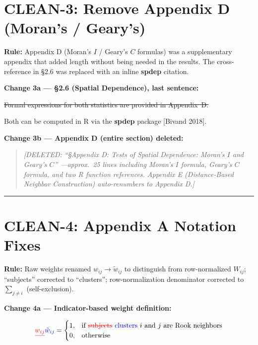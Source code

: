 \documentclass[11pt]{article}
\newcommand{\DEL}[1]{{\color{red}\sout{#1}}}
\newcommand{\ADD}[1]{{\color{blue}#1}}
\begin{document}
\section*{CLEAN-3: Remove Appendix D (Moran's / Geary's)}

\textbf{Rule:} Appendix D (Moran's $I$ / Geary's $C$ formulas) was a supplementary
appendix that added length without being needed in the results. The cross-reference in
\S2.6 was replaced with an inline \textbf{spdep} citation.

\medskip
\textbf{Change 3a --- \S2.6 (Spatial Dependence), last sentence:}

\DEL{Formal expressions for both statistics are provided in Appendix~D.}

\ADD{Both can be computed in R via the \textbf{spdep} package [Bivand 2018].}

\medskip
\textbf{Change 3b --- Appendix D (entire section) deleted:}

\cbstart
\color{red}
\begin{quote}
\textit{[DELETED: ``\S Appendix D: Tests of Spatial Dependence: Moran's $I$ and Geary's $C$''
---approx.\ 25 lines including Moran's $I$ formula, Geary's $C$ formula, and two R function
references. Appendix E (Distance-Based Neighbor Construction) auto-renumbers to Appendix D.]}
\end{quote}
\color{black}
\cbend

\bigskip
\hrule
\bigskip

\section*{CLEAN-4: Appendix A Notation Fixes}

\textbf{Rule:} Raw weights renamed $w_{ij} \to \tilde{w}_{ij}$ to distinguish from
row-normalized $W_{ij}$; ``subjects'' corrected to ``clusters''; row-normalization
denominator corrected to $\sum_{j \neq i}$ (self-exclusion).

\medskip
\textbf{Change 4a --- Indicator-based weight definition:}

\cbstart
\[
  \DEL{w_{ij}} \ADD{\tilde{w}_{ij}} =
  \begin{cases}
    1, & \text{if \DEL{subjects} \ADD{clusters} $i$ and $j$ are Rook neighbors}\\
    0, & \text{otherwise}
  \end{cases}
\]
\cbend
\end{document}
